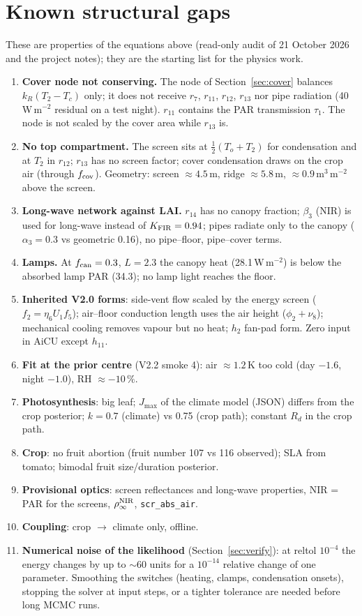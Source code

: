 \documentclass[11pt,a4paper]{article}
\newcommand{\code}[1]{\texttt{#1}}
\begin{document}
\section{Known structural gaps}\label{sec:gaps}
These are properties of the equations above (read-only audit of 21 October 2026 and the project notes); they are the
starting list for the physics work.
\begin{enumerate}[nosep]
\item \textbf{Cover node not conserving.} The node of Section~\ref{sec:cover} balances $k_R(T_2-T_c)$ only; it does not
receive $r_7$, $r_{11}$, $r_{12}$, $r_{13}$ nor pipe radiation (40\,W\,m$^{-2}$ residual on a test night). $r_{11}$ contains the PAR
transmission $\tau_1$. The node is not scaled by the cover area while $r_{13}$ is.
\item \textbf{No top compartment.} The screen sits at $\tfrac12(T_o+T_2)$ for condensation and at $T_2$ in $r_{12}$; $r_{13}$ has
no screen factor; cover condensation draws on the crop air (through $f_{\rm cov}$). Geometry: screen $\approx4.5$\,m, ridge
$\approx5.8$\,m, $\approx0.9$\,m$^3$\,m$^{-2}$ above the screen.
\item \textbf{Long-wave network against LAI.} $r_{14}$ has no canopy fraction; $\beta_3$ (NIR) is used for long-wave instead of
$K_{\rm FIR}=0.94$; pipes radiate only to the canopy ($\alpha_3=0.3$ vs geometric 0.16), no pipe--floor, pipe--cover terms.
\item \textbf{Lamps.} At $f_{\rm can}=0.3$, $L=2.3$ the canopy heat (28.1\,W\,m$^{-2}$) is below the absorbed lamp PAR (34.3); no
lamp light reaches the floor.
\item \textbf{Inherited V2.0 forms}: side-vent flow scaled by the energy screen ($f_2=\eta_6U_1f_5$); air--floor conduction length
uses the air height ($\phi_2+\nu_8$); mechanical cooling removes vapour but no heat; $h_2$ fan-pad form. Zero input in AiCU
except $h_{11}$.
\item \textbf{Fit at the prior centre} (V2.2 smoke 4): air $\approx1.2$\,K too cold (day $-1.6$, night $-1.0$), RH $\approx-10\,\%$.
\item \textbf{Photosynthesis}: big leaf; $J_{\max}$ of the climate model (JSON) differs from the crop posterior; $k=0.7$ (climate) vs
0.75 (crop path); constant $R_d$ in the crop path.
\item \textbf{Crop}: no fruit abortion (fruit number 107 vs 116 observed); SLA from tomato; bimodal fruit size/duration posterior.
\item \textbf{Provisional optics}: screen reflectances and long-wave properties, NIR = PAR for the screens, $\rho_\infty^{\rm NIR}$,
\code{scr\_abs\_air}.
\item \textbf{Coupling}: crop $\to$ climate only, offline.
\item \textbf{Numerical noise of the likelihood} (Section~\ref{sec:verify}): at reltol $10^{-4}$ the energy changes by up to $\sim$60
units for a $10^{-14}$ relative change of one parameter. Smoothing the switches (heating, clamps, condensation onsets),
stopping the solver at input steps, or a tighter tolerance are needed before long MCMC runs.
\end{enumerate}
\end{document}
